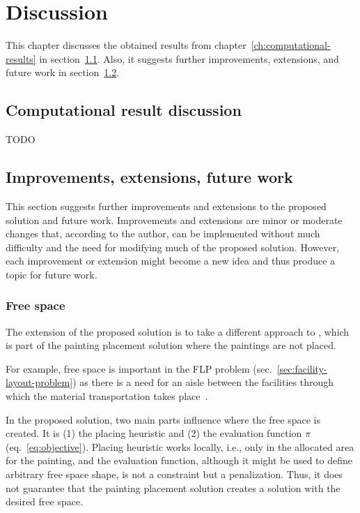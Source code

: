 \chapter{Discussion}\label{ch:discussion}

This chapter discusses the obtained results
from chapter~\ref{ch:computational-results} in section~\ref{sec:comp-res-discussion}.
Also, it suggests further improvements, extensions, and future work in section~\ref{sec:improvements}.


\section{Computational result discussion}\label{sec:comp-res-discussion}
TODO


\section{Improvements, extensions, future work}\label{sec:improvements}
This section suggests further improvements and extensions to the proposed solution
and future work.
Improvements and extensions are minor or moderate changes that, according to the author,
can be implemented without much difficulty and the need for modifying
much of the proposed solution.
However, each improvement or extension might become a new idea and thus produce a topic for future work.

\subsection{Free space}\label{subsec:free-space}

The extension of the proposed solution is to take a different approach to
, which is part of the painting placement solution where the paintings are not placed.

For example, free space is important in the FLP problem (sec.~\ref{sec:facility-layout-problem})
as there is a need for an aisle between the facilities
through which the material transportation takes place~\cite{scholzExtensionsSTaTSPractical2010}.

In the proposed solution, two main parts influence where the free space is created.
It is (1) the placing heuristic and (2) the evaluation function $\pi$ (eq.~\ref{eq:objective}).
Placing heuristic works locally, i.e., only in the allocated area for the painting, and the evaluation
function, although it might be used to define arbitrary free space shape, is not a constraint but a penalization.
Thus, it does not guarantee that the painting placement solution creates a solution with the desired free space.

